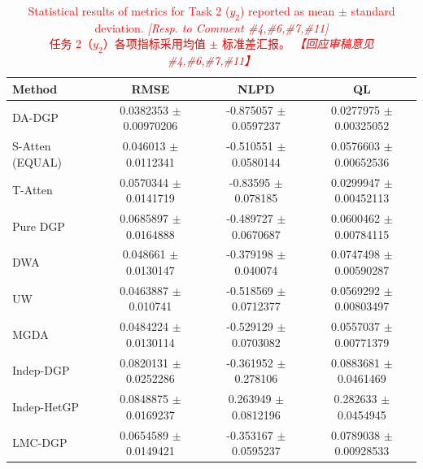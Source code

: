 \documentclass[11pt]{article}
\newcommand{\bicaption}[2]{\caption[#1]{#1\protect\\#2}}
\begin{document}
\begin{table}[htbp]
	\centering
	\bicaption{\textcolor{red}{Statistical results of metrics for Task 2 ($y_2$) reported as mean $\pm$ standard deviation. \textit{[Resp. to Comment \#4,\#6,\#7,\#11]}}}{\textcolor{red}{任务 2（$y_2$）各项指标采用均值 $\pm$ 标准差汇报。 \textit{【回应审稿意见 \#4,\#6,\#7,\#11】}}}
	\label{tab:results_task2}
	{\color{red}\small
	\begin{tabular*}{\textwidth}{@{\extracolsep{\fill}}lccc}
		\toprule
		\textbf{Method} & \textbf{RMSE} & \textbf{NLPD} & \textbf{QL} \\
		\midrule
		DA-DGP & 0.0382353 $\pm$ 0.00970206 & -0.875057 $\pm$ 0.0597237 & 0.0277975 $\pm$ 0.00325052 \\
		S-Atten (EQUAL) & 0.046013 $\pm$ 0.0112341 & -0.510551 $\pm$ 0.0580144 & 0.0576603 $\pm$ 0.00652536 \\
		T-Atten & 0.0570344 $\pm$ 0.0141719 & -0.83595 $\pm$ 0.078185 & 0.0299947 $\pm$ 0.00452113 \\
		Pure DGP & 0.0685897 $\pm$ 0.0164888 & -0.489727 $\pm$ 0.0670687 & 0.0600462 $\pm$ 0.00784115 \\
		DWA & 0.048661 $\pm$ 0.0130147 & -0.379198 $\pm$ 0.040074 & 0.0747498 $\pm$ 0.00590287 \\
		UW & 0.0463887 $\pm$ 0.010741 & -0.518569 $\pm$ 0.0712377 & 0.0569292 $\pm$ 0.00803497 \\
		MGDA & 0.0484224 $\pm$ 0.0130114 & -0.529129 $\pm$ 0.0703082 & 0.0557037 $\pm$ 0.00771379 \\
		Indep-DGP & 0.0820131 $\pm$ 0.0252286 & -0.361952 $\pm$ 0.278106 & 0.0883681 $\pm$ 0.0461469 \\
		Indep-HetGP & 0.0848875 $\pm$ 0.0169237 & 0.263949 $\pm$ 0.0812196 & 0.282633 $\pm$ 0.0454945 \\
		LMC-DGP & 0.0654589 $\pm$ 0.0149421 & -0.353167 $\pm$ 0.0595237 & 0.0789038 $\pm$ 0.00928533 \\
		\bottomrule
	\end{tabular*}
	}
\end{table}
\end{document}
